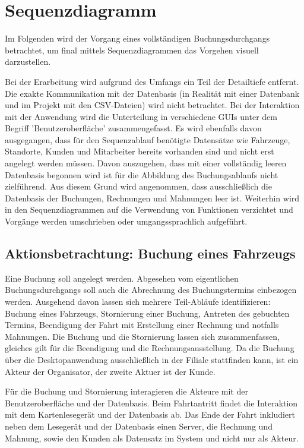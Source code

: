 \chapter{Sequenzdiagramm}

Im Folgenden wird der Vorgang eines vollständigen Buchungsdurchgangs betrachtet, um final mittels Sequenzdiagrammen das Vorgehen visuell darzustellen.

Bei der Erarbeitung wird aufgrund des Umfangs ein Teil der Detailtiefe entfernt. Die exakte Kommunikation mit der Datenbasis (in Realität mit einer Datenbank und im Projekt mit den CSV-Dateien) wird nicht betrachtet. Bei der Interaktion mit der Anwendung wird die Unterteilung in verschiedene GUIs unter dem Begriff 'Benutzeroberfläche' zusammengefasst. Es wird ebenfalls davon ausgegangen, dass für den Sequenzablauf benötigte Datensätze wie Fahrzeuge, Standorte, Kunden und Mitarbeiter bereits vorhanden sind und nicht erst angelegt werden müssen. Davon auszugehen, dass mit einer vollständig leeren Datenbasis begonnen wird ist für die Abbildung des Buchungsablaufs nicht zielführend. Aus diesem Grund wird angenommen, dass ausschließlich die Datenbasis der Buchungen, Rechnungen und Mahnungen leer ist. Weiterhin wird in den Sequenzdiagrammen auf die Verwendung von Funktionen verzichtet und Vorgänge werden umschrieben oder umgangssprachlich aufgeführt.

\newpage

\section{Aktionsbetrachtung: Buchung eines Fahrzeugs}

Eine Buchung soll angelegt werden. Abgesehen vom eigentlichen Buchungsdurchgangs soll auch die Abrechnung des Buchungstermins einbezogen werden. Ausgehend davon lassen sich mehrere Teil-Abläufe identifizieren: Buchung eines Fahrzeugs, Stornierung einer Buchung, Antreten des gebuchten Termins, Beendigung der Fahrt mit Erstellung einer Rechnung und notfalls Mahnungen. Die Buchung und die Stornierung lassen sich zusammenfassen, gleiches gilt für die Beendigung und die Rechnungsausstellung. Da die Buchung über die Desktopanwendung ausschließlich in der Filiale stattfinden kann, ist ein Akteur der Organisator, der zweite Aktuer ist der Kunde.


Für die Buchung und Stornierung interagieren die Akteure mit der Benutzeroberfläche und der Datenbasis. Beim Fahrtantritt findet die Interaktion mit dem Kartenlesegerät und der Datenbasis ab. Das Ende der Fahrt inkludiert neben dem Lesegerät und der Datenbasis einen Server, die Rechnung und Mahnung, sowie den Kunden als Datensatz im System und nicht nur als Akteur.


